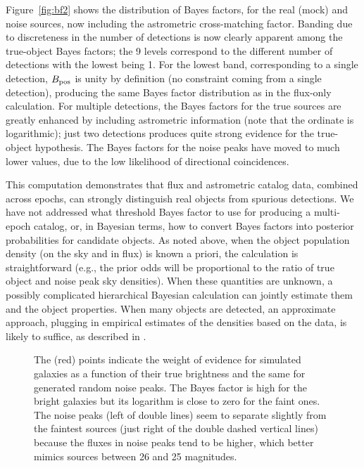 \documentclass[twocolumn]{emulateapj}
\begin{document}
Figure~\ref{fig:bf2} shows the distribution of Bayes factors, for the real (mock) and noise sources, now including the astrometric cross-matching factor.
Banding due to discreteness in the number of detections is now clearly apparent among the true-object Bayes factors; the 9 levels correspond to the different number of detections with the lowest being 1.
For the lowest band, corresponding to a single detection, $B_{\rm{}pos}$ is unity by definition (no constraint coming from a single detection), producing the same Bayes factor distribution as in the flux-only calculation.
For multiple detections, the Bayes factors for the true sources are greatly enhanced by including astrometric information (note that the ordinate is logarithmic); just two detections produces quite strong evidence for the true-object hypothesis.
The Bayes factors for the noise peaks have moved to much lower values, due to the low likelihood of directional coincidences.

This computation demonstrates that flux and astrometric catalog data, combined across epochs, can strongly distinguish real objects from spurious detections.
We have not addressed what threshold Bayes factor to use for producing a multi-epoch catalog, or, in Bayesian terms, how to convert Bayes factors into posterior probabilities for candidate objects.
As noted above, when the object population density (on the sky and in flux) is known a priori, the calculation is straightforward (e.g., the prior odds will be proportional to the ratio of true object and noise peak sky densities).
When these quantities are unknown, a possibly complicated hierarchical Bayesian calculation can jointly estimate them and the object properties.
When many objects are detected, an approximate approach, plugging in empirical estimates of the densities based on the data, is likely to suffice, as described in \cite{B12-SCMAXMatch,L12-HierXMatch}.


\color{red}
\begin{figure}
\caption{The (red) points indicate the weight of evidence for simulated galaxies as a function of their true brightness and the same for generated random noise peaks.
The Bayes factor is high for the bright galaxies but its logarithm is close to zero for the faint ones.
The noise peaks (left of double lines) seem to separate slightly from the faintest sources (just right of the double dashed vertical lines) because the fluxes in noise peaks tend to be higher, which better mimics sources between 26 and 25 magnitudes.}
\label{fig:bf}
\end{figure}
\end{document}
